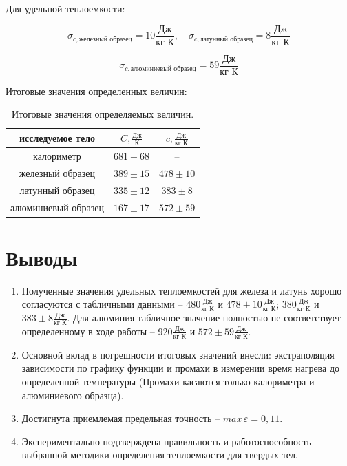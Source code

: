 \documentclass[12pt,a4paper]{article}
\begin{document}
	Для удельной теплоемкости:
	
	$$\sigma_{c, \text{железный образец}} = 10\frac{\text{Дж}}{\text{кг К}}, \quad \sigma_{c, \text{латунный образец}} = 8\frac{\text{Дж}}{\text{кг К}}$$
	
	$$\sigma_{c, \text{алюминиевый образец}} = 59\frac{\text{Дж}}{\text{кг К}}$$
	
	Итоговые значения определенных величин:
	
	\begin{table}[h!]
		\centering
		\begin{tabular}{|c|c|c|}
		\hline
		исследуемое тело & $C, \frac{\text{Дж}}{\text{К}}$ & $c, \frac{\text{Дж}}{\text{кг К}}$ \\ \hline
		калориметр          & $681 \pm 68 $ & --            \\ \hline
		железный образец    & $389 \pm 15 $ & $478 \pm 10 $ \\ \hline
		латунный образец    & $335 \pm 12 $ & $383 \pm 8 $  \\ \hline
		алюминиевый образец & $167 \pm 17 $ & $572 \pm 59 $ \\ \hline
		\end{tabular}
		\caption{Итоговые значения определяемых величин.}
		\label{tab:final_tab}
	\end{table}
		
	\newpage
	
\section{Выводы}

\begin{enumerate}

	\item  Полученные значения удельных теплоемкостей для железа и латунь хорошо согласуются с табличными данными -- $480 \frac{\text{Дж}}{\text{кг  К}}$ и $478 \pm 10 \frac{\text{Дж}}{\text{кг  К}}$; $380 \frac{\text{Дж}}{\text{кг  К}}$ и $383 \pm 8 \frac{\text{Дж}}{\text{кг  К}}$. Для алюминия табличное значение полностью не соответствует определенному в ходе работы -- $920 \frac{\text{Дж}}{\text{кг  К}}$  и $572 \pm 59 \frac{\text{Дж}}{\text{кг  К}}$.
	
	\item Основной вклад в погрешности итоговых значений внесли: экстраполяция зависимости по графику функции и  промахи в измерении время нагрева до определенной температуры (Промахи касаются только калориметра и алюминиевого образца). 
	
	\item Достигнута приемлемая предельная точность -- $max \, \varepsilon = 0,11$.
	
	\item Экспериментально подтверждена правильность и работоспособность выбранной методики определения теплоемкости для твердых тел.
	
\end{enumerate}
\end{document}

